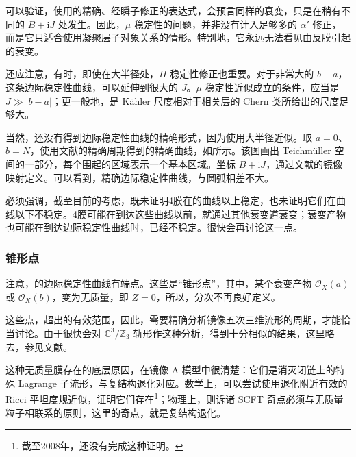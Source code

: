 可以验证，使用的精确、经瞬子修正的表达式，会预言同样的衰变，只是在稍有不同的 $B+\mathrm{i}J$ 处发生。因此，$\mu$ 稳定性的问题，并非没有计入足够多的 $\alpha'$ 修正，而是它只适合使用凝聚层子对象关系的情形。特别地，它永远无法看见由反膜引起的衰变。

还应注意，有时，即使在大半径处，$\Pi$ 稳定性修正也重要。对于非常大的 $b-a$，这条边际稳定性曲线，可以延伸到很大的 $J$。$\mu$ 稳定性近似成立的条件，应当是 $J\gg|b-a|$；更一般地，是 K\"ahler 尺度相对于相关层的 Chern 类所给出的尺度足够大。

当然，还没有得到边际稳定性曲线的精确形式，因为使用大半径近似。取 $a=0$、$b=N$，使用文献的精确周期得到的精确曲线，如所示。该图画出 Teichm\"uller 空间的一部分，每个围起的区域表示一个基本区域。坐标 $B+\mathrm{i}J$，通过文献的镜像映射定义。可以看到，精确边际稳定性曲线，与圆弧相差不大。

必须强调，截至目前的考虑，既未证明4膜在的曲线以上稳定，也未证明它们在曲线以下不稳定。4膜可能在到达这些曲线以前，就通过其他衰变道衰变；衰变产物也可能在到达边际稳定性曲线时，已经不稳定。很快会再讨论这一点。

\subsubsection{锥形点}\label{sec:5.5.6.2}

注意，的边际稳定性曲线有端点。这些是“锥形点”，其中，某个衰变产物 $\mathcal{O}_X(a)$ 或 $\mathcal{O}_X(b)$，变为无质量，即 $Z=0$，所以，分次不再良好定义。

这些点，超出的有效范围，因此，需要精确分析镜像五次三维流形的周期，才能恰当讨论。由于很快会对 $\mathbb{C}^3/\mathbb{Z}_3$ 轨形作这种分析，得到十分相似的结果，这里略去，参见文献。

这种无质量膜存在的底层原因，在镜像 A 模型中很清楚：它们是消灭闭链上的特殊 Lagrange 子流形，与复结构退化对应。数学上，可以尝试使用退化附近有效的 Ricci 平坦度规近似，证明它们存在\footnote{截至2008年，还没有完成这种证明。}；物理上，则诉诸 SCFT 奇点必须与无质量粒子相联系的原则，这里的奇点，就是复结构退化。

